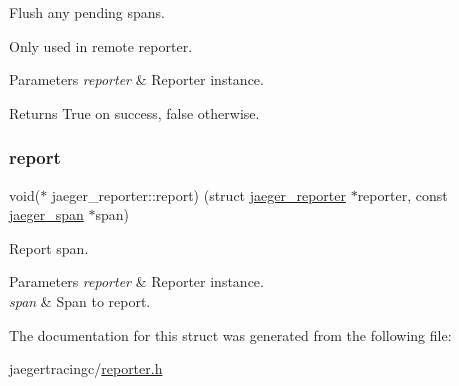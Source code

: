 Flush any pending spans. 

Only used in remote reporter. 
\begin{DoxyParams}{Parameters}
{\em reporter} & Reporter instance. \\
\hline
\end{DoxyParams}
\begin{DoxyReturn}{Returns}
True on success, false otherwise. 
\end{DoxyReturn}
\mbox{\label{structjaeger__reporter_a39f5460f19fe10f0267a6e6be240c1cc}} 
\subsubsection{\texorpdfstring{report}{report}}
{\footnotesize\ttfamily void($\ast$ jaeger\+\_\+reporter\+::report) (struct \mbox{\hyperlink{structjaeger__reporter}{jaeger\+\_\+reporter}} $\ast$reporter, const \mbox{\hyperlink{structjaeger__span}{jaeger\+\_\+span}} $\ast$span)}



Report span. 


\begin{DoxyParams}{Parameters}
{\em reporter} & Reporter instance. \\
\hline
{\em span} & Span to report. \\
\hline
\end{DoxyParams}


The documentation for this struct was generated from the following file\+:\begin{DoxyCompactItemize}
\item 
jaegertracingc/\mbox{\hyperlink{reporter_8h}{reporter.\+h}}\end{DoxyCompactItemize}

